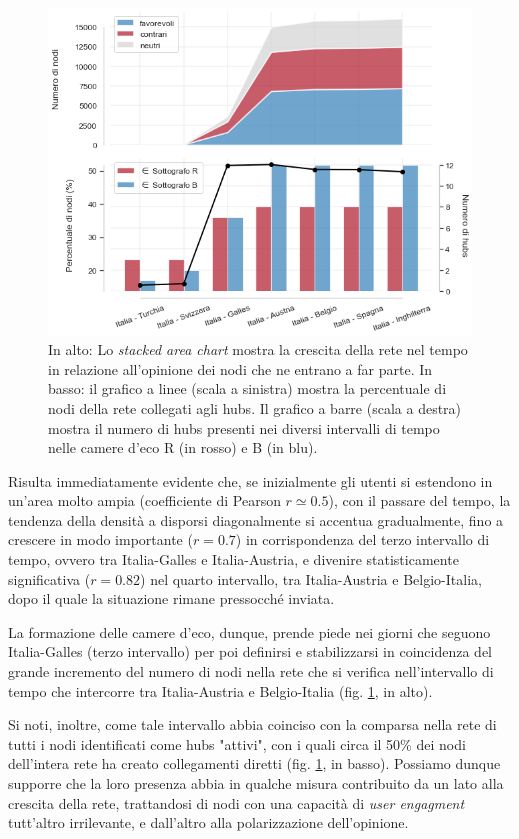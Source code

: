     \begin{figure}[!b]
        \centering
        \includegraphics[scale=.34] {7_Open_question/evolutions.png}
        \caption{In alto: Lo \textit{stacked area chart} mostra la crescita della rete nel tempo in relazione all'opinione dei nodi che ne entrano a far parte. In basso: il grafico a linee (scala a sinistra) mostra la percentuale di nodi della rete collegati agli hubs. Il grafico a barre (scala a destra) mostra il numero di hubs presenti nei diversi intervalli di tempo nelle camere d'eco R (in rosso) e B (in blu).}
        \label{hubs_evolution}
    \end{figure}
    
    Risulta immediatamente evidente che, se inizialmente gli utenti si estendono in un'area molto ampia (coefficiente di Pearson $r \simeq 0.5$), con il passare del tempo, la tendenza della densità a disporsi diagonalmente si accentua gradualmente, fino a crescere in modo importante ($r=0.7$) in corrispondenza del terzo intervallo di tempo, ovvero tra Italia-Galles e Italia-Austria, e divenire statisticamente significativa ($r = 0.82$) nel quarto intervallo, tra Italia-Austria e Belgio-Italia, dopo il quale la situazione rimane pressocché inviata.

    La formazione delle camere d'eco, dunque, prende piede nei giorni che seguono Italia-Galles (terzo intervallo) per poi definirsi e stabilizzarsi in coincidenza del grande incremento del numero di nodi nella rete che si verifica nell'intervallo di tempo che intercorre tra Italia-Austria e Belgio-Italia (fig. \ref{hubs_evolution}, in alto).
    
    Si noti, inoltre, come tale intervallo abbia coinciso con la comparsa nella rete di tutti i nodi identificati come hubs "attivi", con i quali circa il 50\% dei nodi dell'intera rete ha creato collegamenti diretti (fig. \ref{hubs_evolution}, in basso). Possiamo dunque supporre che la loro presenza abbia in qualche misura contribuito da un lato alla crescita della rete, trattandosi di nodi con una capacità di \textit{user engagment} tutt'altro irrilevante, e dall'altro alla polarizzazione dell'opinione.